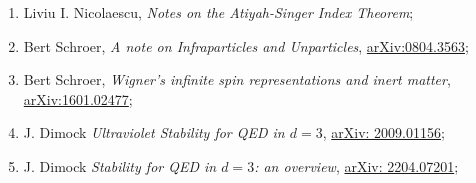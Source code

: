 \documentclass[a4paper,11pt]{article}
\begin{document}
\begin{enumerate}
\item Liviu I. Nicolaescu, \textit{Notes on the Atiyah-Singer Index
    Theorem};

\item Bert Schroer, \textit{A note on Infraparticles and Unparticles},
  \href{https://arxiv.org/abs/0804.3563}{arXiv:0804.3563};

\item Bert Schroer, \textit{Wigner's infinite spin representations and
    inert matter},
  \href{https://arxiv.org/abs/1601.02477}{arXiv:1601.02477};

\item J. Dimock \textit{Ultraviolet Stability for QED in $d = 3$},
  \href{https://arxiv.org/abs/2009.01156}{arXiv: 2009.01156};

\item J. Dimock \textit{Stability for QED in $d = 3$: an overview},
  \href{https://arxiv.org/abs/2204.07201}{arXiv: 2204.07201};


\end{enumerate}
\end{document}
